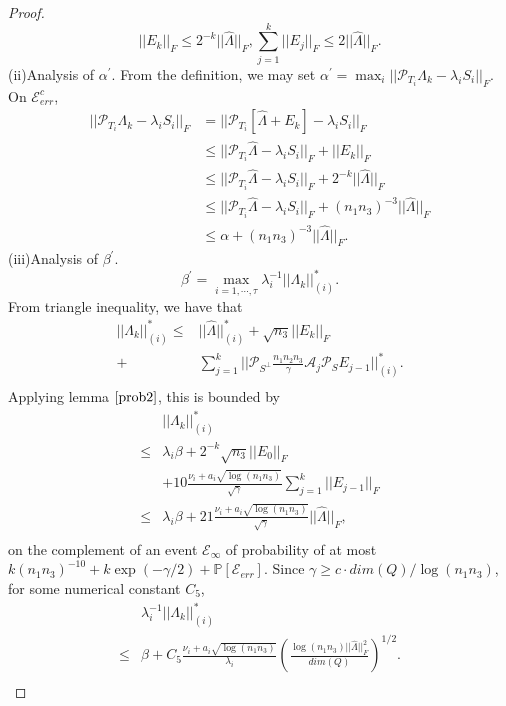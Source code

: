 \documentclass[journal,transmag]{IEEEtran}
\theoremstyle{plain}
\begin{document}
\begin{proof}
\begin{equation}
||E_k||_F \le 2^{-k}||\hat{\Lambda}||_F, \sum_{j=1}^k ||E_j||_F \le 2||\hat{\Lambda}||_F.
\end{equation}
(ii)Analysis of $\alpha^{'}$. From the definition, we may set $\alpha^{'}=\max_i||\mathcal{P}_{T_i}\Lambda_k -\lambda_i S_i||_F$. On $\mathcal{E}_{err}^c$,
\begin{equation}
\begin{split}
||\mathcal{P}_{T_i}\Lambda_k -\lambda_i S_i||_F &= ||\mathcal{P}_{T_i}[\hat{\Lambda}+E_k]-\lambda_i S_i||_F\\
&\le ||\mathcal{P}_{T_i}\hat{\Lambda} -\lambda_i S_i||_F+||E_k||_F\\
&\le ||\mathcal{P}_{T_i}\hat{\Lambda} -\lambda_i S_i||_F+2^{-k}||\hat{\Lambda}||_F\\
&\le ||\mathcal{P}_{T_i}\hat{\Lambda} -\lambda_i S_i||_F+(n_1 n_3)^{-3}||\hat{\Lambda}||_F\\
&\le \alpha+(n_1 n_3)^{-3}||\hat{\Lambda}||_F.
\end{split}
\end{equation}
(iii)Analysis of $\beta^{'}$.
\begin{equation}
\beta^{'}=\max_{i=1,\cdots,\tau}\lambda_i^{-1}||\Lambda_k||^{*}_{(i)}.
\end{equation}
From triangle inequality, we have that
\begin{equation}
\begin{split}
||\Lambda_k||^{*}_{(i)}\le& ||\hat{\Lambda}||^{*}_{(i)}+\sqrt{n_3}||E_k||_F \\
 +&\sum_{j=1}^k ||\mathcal{P}_{S^{\bot}}\frac{n_1 n_2 n_3}{\gamma}\mathcal{A}_j \mathcal{P}_S E_{j-1}||_{(i)}^{*}.\\
\end{split}
\end{equation}
Applying lemma $\ref{prob2}$, this is bounded by
\begin{equation}
\begin{split}
&||\Lambda_k||^{*}_{(i)}\\
\le& \lambda_i \beta+2^{-k}\sqrt{n_3}||E_0||_F  \\
&+10\frac{\nu_i+a_i \sqrt{\log(n_1 n_3)}}{\sqrt{\gamma}}\sum_{j=1}^k ||E_{j-1}||_F\\
\le& \lambda_i \beta +21\frac{\nu_i+a_i\sqrt{\log(n_1 n_3)}}{\sqrt{\gamma}}||\hat{\Lambda}||_F,\\
\end{split}
\end{equation}
on the complement of an event $\mathcal{E}_{\infty}$ of probability of at most $k(n_1 n_3)^{-10}+k\exp(-\gamma/2)+\mathbb{P}[\mathcal{E}_{err}]$. Since $\gamma \ge c\cdot dim(Q)/\log(n_1 n_3)$, for some numerical constant $C_5$,
\begin{equation}
\begin{split}
&\lambda_i^{-1}||\Lambda_k||^{*}_{(i)}\\
\le &\beta + C_5 \frac{\nu_i + a_i\sqrt{ \log(n_1 n_3)}}{\lambda_i}(\frac{\log(n_1 n_3)||\hat{\Lambda}||_F^2}{dim(Q)})^{1/2}.\\
\end{split}
\end{equation}
\end{proof}
\end{document}

